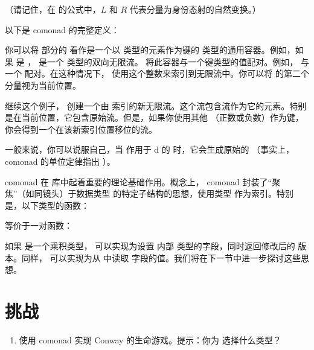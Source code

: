 （请记住，在  的公式中，$L$ 和 $R$ 代表分量为身份态射的自然变换。）

以下是  comonad 的完整定义：

你可以将  部分的  看作是一个以  类型的元素作为键的  类型的通用容器。例如，如果  是 ， 是一个  类型的双向无限流。 将此容器与一个键类型的值配对。例如， 与一个  配对。在这种情况下， 使用这个整数来索引到无限流中。你可以将  的第二个分量视为当前位置。

继续这个例子， 创建一个由  索引的新无限流。这个流包含流作为它的元素。特别是在当前位置，它包含原始流。但是，如果你使用其他 （正数或负数）作为键，你会得到一个在该新索引位置移位的流。

一般来说，你可以说服自己，当  作用于 d 的  时，它会生成原始的 （事实上，comonad 的单位定律指出 ）。

 comonad 在  库中起着重要的理论基础作用。概念上， comonad 封装了“聚焦”（如同镜头）于数据类型  的特定子结构的思想，使用类型  作为索引。特别是，以下类型的函数：

等价于一对函数：

如果  是一个乘积类型， 可以实现为设置  内部  类型的字段，同时返回修改后的  版本。同样， 可以实现为从  中读取  字段的值。我们将在下一节中进一步探讨这些思想。

\section{挑战}

\begin{enumerate}
  \tightlist
  \item
  使用  comonad 实现 Conway 的生命游戏。提示：你为  选择什么类型？
\end{enumerate}
